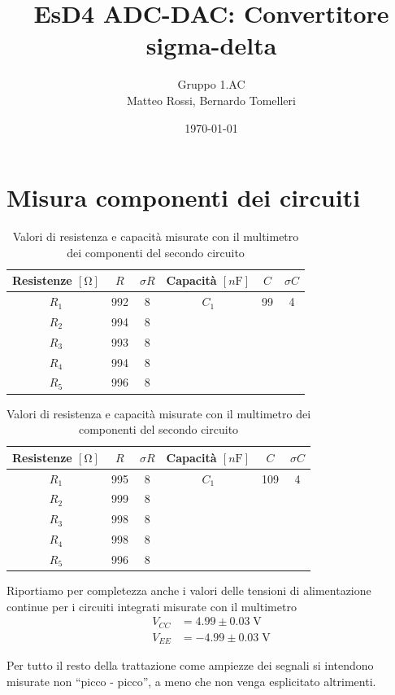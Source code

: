 \documentclass[10pt, a4paper, italian]{article}
\author{Gruppo 1.AC \\ Matteo Rossi, Bernardo Tomelleri}
\title{EsD4 ADC-DAC: Convertitore sigma-delta}
\begin{document}
\date{\today}
\maketitle

\section*{Misura componenti dei circuiti}
\begin{table}[htbp]
\centering
\begin{tabular}{cccccc}
\toprule
Resistenze $[\si{\ohm}]$ & $R$ & $\sigma R$ & Capacità $[\si{n\F}]$ & $C$ &
$\sigma C$ \\
\midrule
\midrule
$R_1$	  	& 992 	& 8		& $C_1$ & 99	& 4 \\
$R_2$	  	& 994	& 8		& & & \\
$R_3$	  	& 993	& 8		& & & \\
$R_4$	  	& 994 	& 8	& & & \\
$R_5$	  	& 996	& 8 & & & \\
\bottomrule   
\end{tabular}
\caption{Valori di resistenza e capacità misurate con il multimetro dei
componenti del primo circuito.}

\begin{tabular}{cccccc}
\toprule
Resistenze $[\si{\ohm}]$ & $R$ & $\sigma R$ & Capacità $[\si{n\F}]$ & $C$ &
$\sigma C$ \\
\midrule
\midrule
$R_1$	  	& 995 	& 8		& $C_1$ & 109	& 4 \\
$R_2$	  	& 999	& 8		& & & \\
$R_3$	  	& 998	& 8		& & & \\
$R_4$	  	& 998 	& 8	& & & \\
$R_5$	  	& 996	& 8 & & & \\
\bottomrule   
\end{tabular}
\caption{Valori di resistenza e capacità misurate con il multimetro
dei componenti del secondo circuito}
\end{table}

Riportiamo per completezza anche i valori delle tensioni di alimentazione
continue per i circuiti integrati misurate con il multimetro
\begin{align*}
V_{CC} &= 4.99 \pm 0.03 \; \si{\V} \\
V_{EE} &= -4.99 \pm 0.03 \; \si{\V}
\end{align*}

Per tutto il resto della trattazione come ampiezze dei segnali si intendono
misurate non ``picco - picco'', a meno che non venga esplicitato altrimenti.
\end{document}
